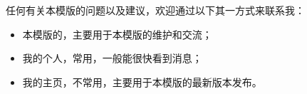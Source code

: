 \begin{summary}

    任何有关本模版的问题以及建议，欢迎通过以下其一方式来联系我：
    \begin{itemize}
        \item 本模版的\href{https://jq.qq.com/?_wv=1027&k=eA9mGWmS}{}，主要用于本模版的维护和交流；
        \item 我的个人\href{https://space.bilibili.com/326100515}{}，常用，一般能很快看到消息；
        \item 我的\href{https://space.bilibili.com/326100515}{}主页，不常用，主要用于本模版的最新版本发布。
    \end{itemize}
\end{summary}